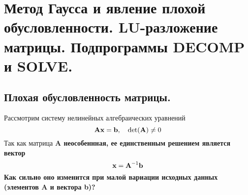 \documentclass[../../calc-math-exam-2023.tex]{subfiles}
\begin{document}
    \section{Метод Гаусса и явление плохой обусловленности. \textbf{LU}-разложение матрицы. Подпрограммы \textbf{DECOMP} и \textbf{SOLVE}.}\label{sec:ch20}

    \subsection{Плохая обусловленность матрицы.}
    Рассмотрим систему нелинейных алгебраических уравнений
    \begin{equation}
        \bf{A}\bf{x} = \bf{b}, \quad \det (\bf{A}) \neq 0 \label{eq:nonlinear_algebraic_equation}
    \end{equation}
    Так как матрица \bf{A} неособеннная, ее единственным решением является вектор
    \begin{equation}
        \bf{x} = \bf{A}^{-1}\bf{b}
    \end{equation}
    Как сильно оно изменится при малой вариации исходных данных (элементов \bf{A} и вектора \bf{b})?
\end{document}
